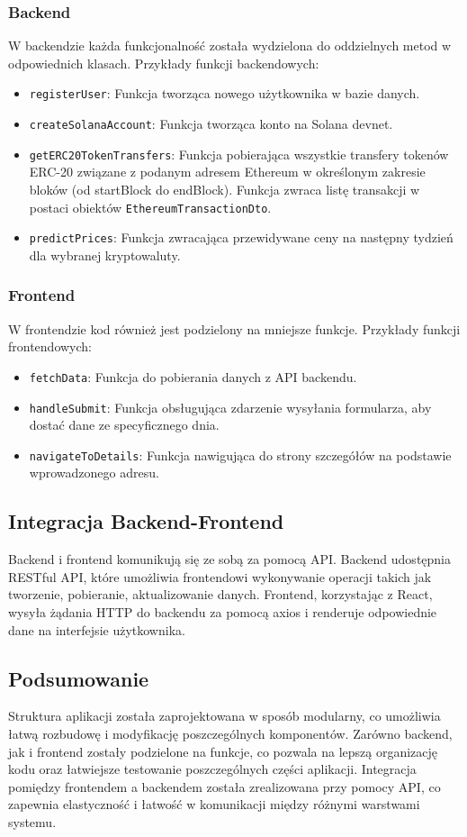 \subsubsection{Backend}
W backendzie każda funkcjonalność została wydzielona do oddzielnych metod w odpowiednich klasach. Przykłady funkcji backendowych:
\begin{itemize}
    \item \texttt{registerUser}: Funkcja tworząca nowego użytkownika w bazie danych.
    \item \texttt{createSolanaAccount}: Funkcja tworząca konto na Solana devnet.
    \item \texttt{getERC20TokenTransfers}: Funkcja pobierająca wszystkie transfery tokenów ERC-20 związane z podanym adresem Ethereum w określonym zakresie bloków (od startBlock do endBlock). Funkcja zwraca listę transakcji w postaci obiektów \texttt{EthereumTransactionDto}.
		\item \texttt{predictPrices}: Funkcja zwracająca przewidywane ceny na następny tydzień dla wybranej kryptowaluty.
\end{itemize}

\subsubsection{Frontend}
W frontendzie kod również jest podzielony na mniejsze funkcje. Przykłady funkcji frontendowych:
\begin{itemize}
    \item \texttt{fetchData}: Funkcja do pobierania danych z API backendu.
    \item \texttt{handleSubmit}: Funkcja obsługująca zdarzenie wysyłania formularza, aby dostać dane ze specyficznego dnia.
    \item \texttt{navigateToDetails}: Funkcja nawigująca do strony szczegółów na podstawie wprowadzonego adresu.
\end{itemize}

\subsection{Integracja Backend-Frontend}

Backend i frontend komunikują się ze sobą za pomocą API. Backend udostępnia RESTful API, które umożliwia frontendowi wykonywanie operacji takich jak tworzenie, pobieranie, aktualizowanie danych. Frontend, korzystając z React, wysyła żądania HTTP do backendu za pomocą axios i renderuje odpowiednie dane na interfejsie użytkownika.

\subsection{Podsumowanie}

Struktura aplikacji została zaprojektowana w sposób modularny, co umożliwia łatwą rozbudowę i modyfikację poszczególnych komponentów. Zarówno backend, jak i frontend zostały podzielone na funkcje, co pozwala na lepszą organizację kodu oraz łatwiejsze testowanie poszczególnych części aplikacji. Integracja pomiędzy frontendem a backendem została zrealizowana przy pomocy API, co zapewnia elastyczność i łatwość w komunikacji między różnymi warstwami systemu.